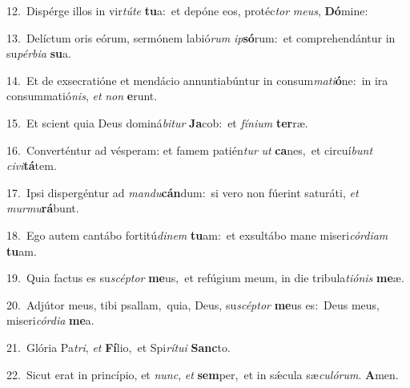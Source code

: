 {\numbfont\textcolor{\numbcolor}{12.}}~Dispérge illos in vir\-\textit{tú}\-\textit{te} \textbf{tu}\-a:~\star et depóne eos, protéc\textit{tor} \textit{me}\-\textit{us}, \textbf{Dó}\-mine:\par
{\numbfont\textcolor{\numbcolor}{13.}}~Delíctum oris eórum, sermónem labió\textit{rum} \textit{ip}\-\textbf{só}rum:~\star et comprehendántur in su\-\textit{pér}\-\textit{bi}\textit{a} \textbf{su}\-a.\par
{\numbfont\textcolor{\numbcolor}{14.}}~Et de exsecratióne et mendácio annuntiabúntur in consum\-\textit{ma}\-\textit{ti}\textbf{ó}ne:~\star in ira consummatió\-\textit{nis}\-, \textit{et} \textit{non} \textbf{e}\-runt.\par
{\numbfont\textcolor{\numbcolor}{15.}}~Et scient quia Deus dominá\-\textit{bi}\-\textit{tur} \textbf{Ja}\-cob:~\star et \textit{fí}\-\textit{ni}\textit{um} \textbf{ter}\-ræ.\par
{\numbfont\textcolor{\numbcolor}{16.}}~Converténtur ad vésperam: et famem patién\textit{tur} \textit{ut} \textbf{ca}\-nes,~\star et circuí\textit{bunt} \textit{ci}\-\textit{vi}\textbf{tá}tem.\par
{\numbfont\textcolor{\numbcolor}{17.}}~Ipsi dispergéntur ad \textit{man}\-\textit{du}\textbf{cán}dum:~\star si vero non fúerint saturáti, \textit{et} \textit{mur}\-\textit{mu}\textbf{rá}bunt.\par
{\numbfont\textcolor{\numbcolor}{18.}}~Ego autem cantábo fortitú\-\textit{di}\-\textit{nem} \textbf{tu}\-am:~\star et exsultábo mane miseri\-\textit{cór}\-\textit{di}\textit{am} \textbf{tu}\-am.\par
{\numbfont\textcolor{\numbcolor}{19.}}~Quia factus es su\-\textit{scép}\-\textit{tor} \textbf{me}\-us,~\star et refúgium meum, in die tribula\-\textit{ti}\-\textit{ó}\textit{nis} \textbf{me}\-æ.\par
{\numbfont\textcolor{\numbcolor}{20.}}~Adjútor meus, tibi psallam,~\dagger quia, Deus, su\-\textit{scép}\-\textit{tor} \textbf{me}\-us es:~\star Deus meus, miseri\-\textit{cór}\-\textit{di}\textit{a} \textbf{me}\-a.\par
{\numbfont\textcolor{\numbcolor}{21.}}~Glória Pa\-\textit{tri}\-, \textit{et} \textbf{Fí}\-lio,~\star et Spi\-\textit{rí}\-\textit{tu}\textit{i} \textbf{Sanc}\-to.\par
{\numbfont\textcolor{\numbcolor}{22.}}~Sicut erat in princípio, et \textit{nunc}\-, \textit{et} \textbf{sem}\-per,~\star et in sǽcula sæ\-\textit{cu}\-\textit{ló}\textit{rum}. \textbf{A}\-men.\par
